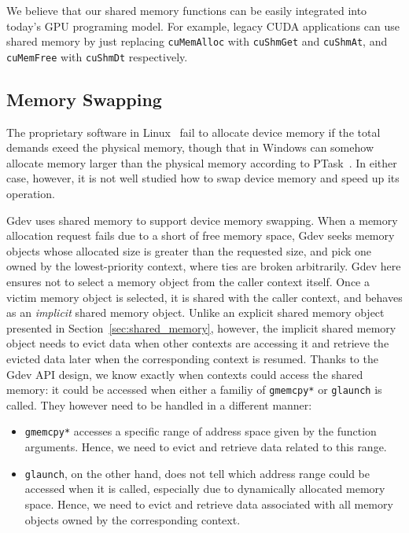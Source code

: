 We believe that our shared memory functions can be easily integrated
into today's GPU programing model.
For example, legacy CUDA applications can use shared memory by just
replacing \texttt{cuMemAlloc} with \texttt{cuShmGet} and
\texttt{cuShmAt}, and \texttt{cuMemFree} with \texttt{cuShmDt}
respectively.

\subsection{Memory Swapping}
\label{sec:memory_swapping}

The proprietary software in Linux~\cite{BLOB,CUDA40} fail to allocate
device memory if the total demands exeed the physical memory, though
that in Windows can somehow allocate memory larger than the physical
memory according to PTask~\cite{Rossbach_SOSP11}. 
In either case, however, it is not well studied how to swap device
memory and speed up its operation.

Gdev uses shared memory to support device memory swapping.
When a memory allocation request fails due to a short of free memory
space, Gdev seeks memory objects whose allocated size is greater than
the requested size, and pick one owned by the lowest-priority context,
where ties are broken arbitrarily.
Gdev here ensures not to select a memory object from the caller context
itself.
Once a victim memory object is selected, it is shared with the caller
context, and behaves as an \textit{implicit} shared memory object.
Unlike an explicit shared memory object presented in
Section~\ref{sec:shared_memory}, however, the implicit shared memory
object needs to evict data when other contexts are accessing it and
retrieve the evicted data later when the corresponding context is
resumed.
Thanks to the Gdev API design, we know exactly when contexts could
access the shared memory: it could be accessed when either a familiy of
\texttt{gmemcpy*} or \texttt{glaunch} is called.
They however need to be handled in a different manner:
\begin{itemize}
 \vspace{-0.25em}
 \item \texttt{gmemcpy*} accesses a specific range of address space
       given by the function arguments.
       Hence, we need to evict and retrieve data related to this range.
 \vspace{-0.5em}
 \item \texttt{glaunch}, on the other hand, does not tell which address
       range could be accessed when it is called, especially due to
       dynamically allocated memory space.
       Hence, we need to evict and retrieve data associated with all
       memory objects owned by the corresponding context.
 \vspace{-0.25em}
\end{itemize}

